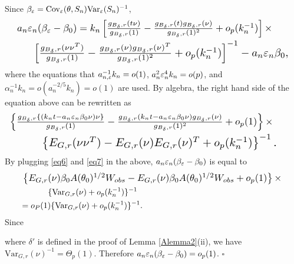 	Since $\beta_{\varepsilon}=\text{Cov}_{\varepsilon}(\theta,S_{n})\text{Var}_{\varepsilon}(S_{n})^{-1}$,
	\begin{align*}
	&\resizebox{0.92\hsize}{!}{
	$a_{n}\veps_{n}(\beta_{\veps}-\beta_{0})= k_{n}\left[\frac{g_{B_{\delta},r}(t\nu)}{g_{B_{\delta},r}(1)}-\frac{g_{B_{\delta},r}(t)g_{B_{\delta},r}(\nu)}{g_{B_{\delta},r}(1)^{2}}+o_{p}(k_{n}^{-1})\right]\times$
	}\\
	&\qquad \resizebox{0.92\hsize}{!}{
	$\left[\frac{g_{B_{\delta},r}(\nu\nu^{T})}{g_{B_{\delta},r}(1)}-\frac{g_{B_{\delta},r}(\nu)g_{B_{\delta},r}(\nu)^{T}}{g_{B_{\delta},r}(1)^{2}}+o_{p}(k_{n}^{-1})\right]^{-1}-a_{n}\veps_{n}\beta_{0},$
	}
	\end{align*}
	where the equations that $a_{n,\varepsilon}^{-1}k_{n}=o(1)$, $a_{n}^{2}\varepsilon_{n}^{4}k_{n}=o(p)$,
	and $\alpha_{n}^{-1}k_{n}=o(a_{n}^{-2/5}k_{n})=o(1)$ are used. By
	algebra, the right hand side of the equation above can be rewritten
	as 
	\begin{eqnarray*}
	&\hspace{-1cm}\resizebox{0.95\hsize}{!}{
	$\left\{ \frac{g_{B_{\delta},r}\{(k_{n}t-a_{n}\veps_{n}\beta_{0}\nu)\nu\}}{g_{B_{\delta},r}(1)}-\frac{g_{B_{\delta},r}(k_{n}t-a_{n}\veps_{n}\beta_{0}\nu)g_{B_{\delta},r}(\nu)}{g_{B_{\delta},r}(1)^{2}}+o_{p}(1)\right\} \times$ }\\
	&\quad \resizebox{0.84\hsize}{!}{
	$\left\{ E_{G,r}(\nu\nu^{T})-E_{G,r}(\nu)E_{G,r}(\nu)^{T}+o_{p}(k_{n}^{-1})\right\} ^{-1}.$}
	\end{eqnarray*}
	By plugging \eqref{eq6} and \eqref{eq7} in the above, $a_{n}\varepsilon_{n}(\beta_{\varepsilon}-\beta_{0})$
	is equal to 
	\begin{eqnarray*}
		&\hspace{-2mm} \resizebox{0.92\hsize}{!}{
		$\left\{ E_{G,r}(\nu)\beta_{0}A(\theta_{0})^{1/2}W_{\rm obs}-E_{G,r}(\nu)\beta_{0}A(\theta_{0})^{1/2}W_{\rm obs}+o_{p}(1)\right\} \times$} \\
		&\hspace{1cm}
		\{\text{Var}_{G,r}(\nu)+o_{p}(k_{n}^{-1})\}^{-1}\\
		&\hspace{-2mm}= o_{P}(1)\{\text{Var}_{G,r}(\nu)+o_{p}(k_{n}^{-1})\}^{-1}.
	\end{eqnarray*}
	Since
	
	where $\delta'$ is defined in the proof of Lemma \ref{Alemma2}(ii),
	we have $\text{Var}_{G,r}(\nu)^{-1}=\Theta_{p}(1)$. Therefore $a_{n}\varepsilon_{n}(\beta_{\varepsilon}-\beta_{0})=o_{p}(1)$.
	\hfill{$\square$} 

